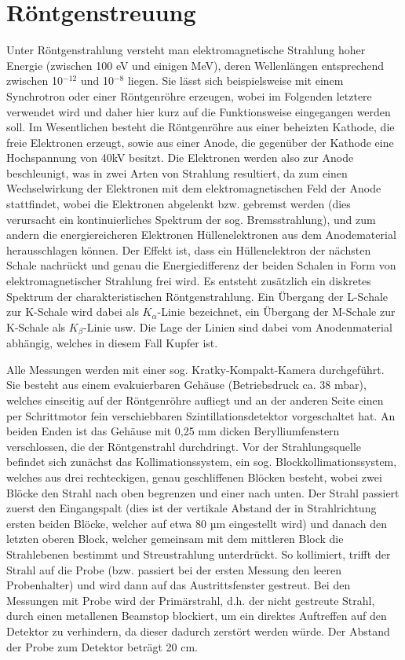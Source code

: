 \documentclass[bigchapter,colorback,accentcolor=tud4b,linedtoc,11pt]{tudreport}
\begin{document}
\section{Röntgenstreuung}

Unter Röntgenstrahlung versteht man elektromagnetische Strahlung hoher Energie (zwischen 100 eV und einigen MeV), deren Wellenlängen entsprechend zwischen 10$^{-12}$ und 10$^{-8}$ liegen. Sie lässt sich beispielsweise mit einem Synchrotron oder einer Röntgenröhre erzeugen, wobei im Folgenden letztere verwendet wird und daher hier kurz auf die Funktionsweise eingegangen werden soll. Im Wesentlichen besteht die Röntgenröhre aus einer beheizten Kathode, die freie Elektronen erzeugt, sowie aus einer Anode, die gegenüber der Kathode eine Hochspannung von 40kV besitzt. Die Elektronen werden also zur Anode beschleunigt, was in zwei Arten von Strahlung resultiert, da zum einen Wechselwirkung der Elektronen mit dem elektromagnetischen Feld der Anode stattfindet, wobei die Elektronen abgelenkt bzw. gebremst werden (dies verursacht ein kontinuierliches Spektrum der sog. Bremsstrahlung), und zum andern die energiereicheren Elektronen Hüllenelektronen aus dem Anodematerial herausschlagen können. Der Effekt ist, dass ein Hüllenelektron der nächsten Schale nachrückt und genau die Energiedifferenz der beiden Schalen in Form von elektromagnetischer Strahlung frei wird. Es entsteht zusätzlich ein diskretes Spektrum der charakteristischen Röntgenstrahlung. Ein Übergang der L-Schale zur K-Schale wird dabei als $K_{\alpha}$-Linie bezeichnet, ein Übergang der M-Schale zur K-Schale als $K_{\beta}$-Linie usw. Die Lage der Linien sind dabei vom Anodenmaterial abhängig, welches in diesem Fall Kupfer ist. 

Alle Messungen werden mit einer sog. Kratky-Kompakt-Kamera durchgeführt. Sie besteht aus einem evakuierbaren Gehäuse (Betriebsdruck ca. 38 mbar), welches einseitig auf der Röntgenröhre aufliegt und an der anderen Seite einen per Schrittmotor fein verschiebbaren Szintillationsdetektor vorgeschaltet hat. An beiden Enden ist das Gehäuse mit 0,25 mm dicken Berylliumfenstern verschlossen, die der Röntgenstrahl durchdringt. Vor der Strahlungsquelle befindet sich zunächst das Kollimationssystem, ein sog. Blockkollimationssystem, welches aus drei rechteckigen, genau geschliffenen Blöcken besteht, wobei zwei Blöcke den Strahl nach oben begrenzen und einer nach unten. Der Strahl passiert zuerst den Eingangspalt (dies ist der vertikale Abstand der in Strahlrichtung ersten beiden Blöcke, welcher auf etwa 80 µm eingestellt wird) und danach den letzten oberen Block, welcher gemeinsam mit dem mittleren Block die Strahlebenen bestimmt und Streustrahlung unterdrückt. So kollimiert, trifft der Strahl auf die Probe (bzw. passiert bei der ersten Messung den leeren Probenhalter) und wird dann auf das Austrittsfenster gestreut. Bei den Messungen mit Probe wird der Primärstrahl, d.h. der nicht gestreute Strahl, durch einen metallenen Beamstop blockiert, um ein direktes Auftreffen auf den Detektor zu verhindern, da dieser dadurch zerstört werden würde. Der Abstand der Probe zum Detektor beträgt 20 cm.
\end{document}
